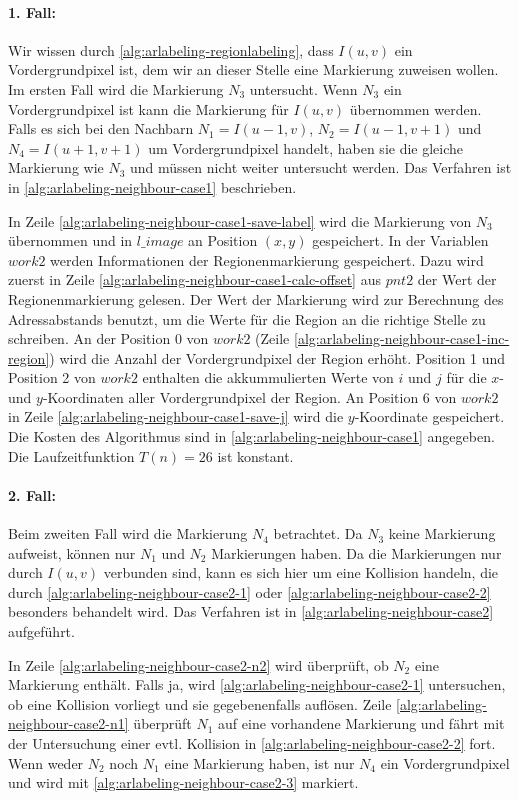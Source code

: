 \paragraph{1. Fall:} %
\label{par:fall_1_}
Wir wissen durch \autoref{alg:arlabeling-regionlabeling}, dass $I(u,v)$ ein Vordergrundpixel ist, dem wir an dieser
 Stelle eine Markierung zuweisen wollen. Im ersten Fall wird die Markierung $N_3$ untersucht. Wenn $N_3$ ein
 Vordergrundpixel ist kann die Markierung für $I(u,v)$ übernommen werden. Falls es sich bei den Nachbarn
 $N_1 = I(u-1,v)$, $N_2 = I(u-1,v+1)$ und $N_4 = I(u+1,v+1)$ um Vordergrundpixel handelt, haben sie die gleiche
 Markierung wie $N_3$ und müssen nicht weiter untersucht werden. Das Verfahren ist in
 \autoref{alg:arlabeling-neighbour-case1} beschrieben.

In Zeile \ref{alg:arlabeling-neighbour-case1-save-label} wird die Markierung von $N_3$ übernommen und in
 $\mathit{l\_image}$ an Position $(x,y)$ gespeichert. In der Variablen $\mathit{work2}$ werden Informationen der
 Regionenmarkierung gespeichert. Dazu wird zuerst in Zeile \ref{alg:arlabeling-neighbour-case1-calc-offset} aus
 $\mathit{pnt2}$ der Wert der Regionenmarkierung gelesen. Der Wert der Markierung wird zur Berechnung des
 Adressabstands benutzt, um die Werte für die Region an die richtige Stelle zu schreiben. An der Position $0$ von
 $\mathit{work2}$ (Zeile \ref{alg:arlabeling-neighbour-case1-inc-region}) wird die Anzahl der Vordergrundpixel der
 Region erhöht. Position 1 und Position 2 von $\mathit{work2}$ enthalten die akkummulierten Werte von $i$ und $j$ für
 die $x$- und $y$-Koordinaten aller Vordergrundpixel der Region. An Position 6 von $\mathit{work2}$ in Zeile
 \ref{alg:arlabeling-neighbour-case1-save-j} wird die $y$-Koordinate gespeichert. Die Kosten des Algorithmus sind in
 \autoref{alg:arlabeling-neighbour-case1} angegeben. Die Laufzeitfunktion $T(n) = 26$ ist konstant.

\paragraph{2. Fall:} %
\label{par:fall_2_}
Beim zweiten Fall wird die Markierung $N_4$ betrachtet. Da $N_3$ keine Markierung aufweist, können nur $N_1$ und $N_2$
 Markierungen haben. Da die Markierungen nur durch $I(u,v)$ verbunden sind, kann es sich hier um eine Kollision
 handeln, die durch \autoref{alg:arlabeling-neighbour-case2-1} oder \autoref{alg:arlabeling-neighbour-case2-2}
 besonders behandelt wird. Das Verfahren ist in \autoref{alg:arlabeling-neighbour-case2} aufgeführt.

In Zeile \ref{alg:arlabeling-neighbour-case2-n2} wird überprüft, ob $N_2$ eine Markierung enthält. Falls ja, wird
 \autoref{alg:arlabeling-neighbour-case2-1} untersuchen, ob eine Kollision vorliegt und sie gegebenenfalls auflösen.
 Zeile \ref{alg:arlabeling-neighbour-case2-n1} überprüft $N_1$ auf eine vorhandene Markierung und fährt mit der
 Untersuchung einer evtl. Kollision in \autoref{alg:arlabeling-neighbour-case2-2} fort. Wenn weder $N_2$ noch $N_1$
 eine Markierung haben, ist nur $N_4$ ein Vordergrundpixel und wird mit \autoref{alg:arlabeling-neighbour-case2-3}
 markiert.

